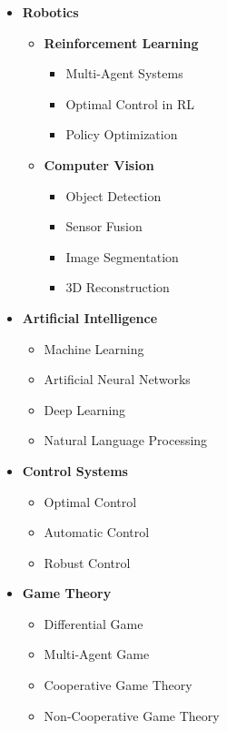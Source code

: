 \documentclass[12pt]{article}
\begin{document}
\vspace{6pt}
\begin{multicols}{2} %
	\centering
\begin{itemize} %
	\item \textbf{Robotics}
	\begin{itemize} \itemsep -1pt %
	    \item \textbf{Reinforcement Learning}
	    \begin{itemize} 
	        \item Multi-Agent Systems
	        \item Optimal Control in RL
	        \item Policy Optimization
	    \end{itemize}
	    \item \textbf{Computer Vision}
	    \begin{itemize} 
	        \item Object Detection
	        \item Sensor Fusion
	        \item Image Segmentation
	        \item 3D Reconstruction
	    \end{itemize}
	\end{itemize}
	\item \textbf{Artificial Intelligence}
	\begin{itemize} \itemsep -1pt
	    \item Machine Learning 
	    \item Artificial Neural Networks 
	    \item Deep Learning 
	    \item Natural Language Processing
	\end{itemize}
	\item \textbf{Control Systems}
	\begin{itemize} \itemsep -1pt
	    \item Optimal Control
	    \item Automatic Control
	    \item Robust Control
	\end{itemize}
	\item \textbf{Game Theory}
	\begin{itemize} \itemsep -1pt
	    \item Differential Game
	    \item Multi-Agent Game
	    \item Cooperative Game Theory
	    \item Non-Cooperative Game Theory
	\end{itemize}
\end{itemize}
\end{multicols}
\end{document}
